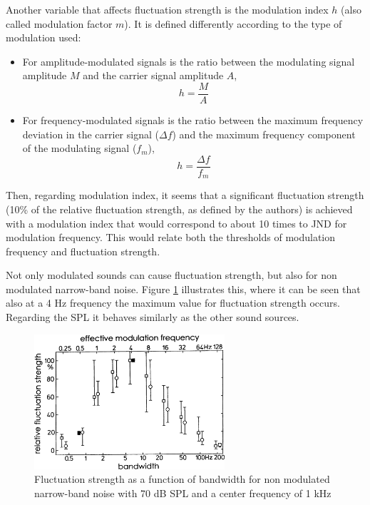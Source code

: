 Another variable that affects fluctuation strength is the modulation index $h$
(also called modulation factor $m$). It is defined differently according to the
type of modulation used:
\begin{itemize}
    \item For amplitude-modulated signals is the ratio between the modulating
        signal amplitude $M$ and the carrier signal amplitude $A$,
        \begin{equation}
            h=\frac{M}{A}
        \end{equation}
    \item For frequency-modulated signals is the ratio between the maximum
        frequency deviation in the carrier signal ($\Delta f$) and the maximum
        frequency component of the modulating signal ($f_m$),
        \begin{equation}
            h=\frac{\Delta f}{f_m}
        \end{equation}
\end{itemize}

Then, regarding modulation index, it seems that a significant fluctuation
strength (10\% of the relative fluctuation strength, as defined by the authors)
is achieved with a modulation index that would correspond to about 10 times to
JND for modulation frequency. This would relate both the thresholds of
modulation frequency and fluctuation strength.

Not only modulated sounds can cause fluctuation strength, but also for non
modulated narrow-band noise. Figure \ref{fig:flucstrenvsbandwith} illustrates
this, where it can be seen that also at a 4 Hz frequency the maximum value for
fluctuation strength occurs. Regarding the SPL it behaves similarly as the other
sound sources.

\begin{figure}
    \centering
    \includegraphics[height=5cm]
        {img/Fastl2007-FluctuationStrengthvsBandwidth}
    \caption{Fluctuation strength as a function of bandwidth for non modulated
        narrow-band noise with 70 dB SPL and a center frequency of 1 kHz
        \cite[pp. 252]{Fastl2007Psychoacoustics}}
    \label{fig:flucstrenvsbandwith}
\end{figure}


